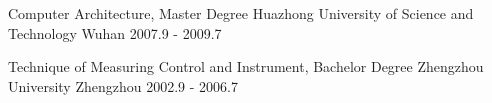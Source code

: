

\begin{cventries}

  \cventry
    {Computer Architecture, Master Degree} %
    {Huazhong University of Science and Technology} %
    {Wuhan} %
    {2007.9 - 2009.7} %
    {
      \begin{cvitems} %
      \end{cvitems}
    }

  \cventry
    {Technique of Measuring Control and Instrument, Bachelor Degree} %
    {Zhengzhou University} %
    {Zhengzhou} %
    {2002.9 - 2006.7} %
    {
      \begin{cvitems} %
      \end{cvitems}
    }

\end{cventries}
